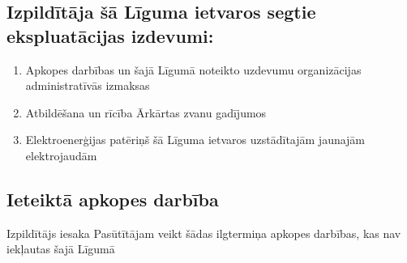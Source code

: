 \begin{center}
\end{center}

\subsection{Izpildītāja šā Līguma ietvaros segtie ekspluatācijas izdevumi:}
\begin{enumerate}
	\item Apkopes darbības un šajā Līgumā noteikto uzdevumu organizācijas administratīvās izmaksas
	\item Atbildēšana un rīcība Ārkārtas zvanu gadījumos
	\item Elektroenerģijas patēriņš šā Līguma ietvaros uzstādītajām jaunajām elektrojaudām
\end{enumerate}


\subsection{Ieteiktā apkopes darbība}

Izpildītājs iesaka Pasūtītājam veikt šādas ilgtermiņa apkopes darbības, kas nav iekļautas šajā Līgumā


\begin{center}
\end{center}
